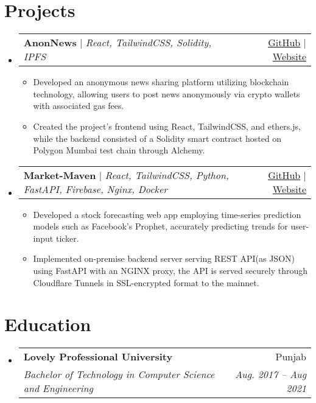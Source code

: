\documentclass[letterpaper,11pt]{article}
\makeatletter
\newcommand{\resumeItem}[1]{
  \item\small{
    {#1 \vspace{-2pt}}
  }
}
\newcommand{\resumeSubheading}[4]{
  \vspace{-2pt}\item
    \begin{tabular*}{0.97\textwidth}[t]{l@{\extracolsep{\fill}}r}
      \textbf{#1} & #2 \\
      \textit{\small#3} & \textit{\small #4} \\
    \end{tabular*}\vspace{-7pt}
}
\newcommand{\resumeProjectHeading}[2]{
    \item
    \begin{tabular*}{0.97\textwidth}{l@{\extracolsep{\fill}}r}
      \small#1 & #2 \\
    \end{tabular*}\vspace{-7pt}
}
\newcommand{\resumeSubHeadingListStart}{\begin{itemize}[leftmargin=0.15in, label={}]}
\newcommand{\resumeSubHeadingListEnd}{\end{itemize}}
\newcommand{\resumeItemListStart}{\begin{itemize}}
\newcommand{\resumeItemListEnd}{\end{itemize}\vspace{-5pt}}
\makeatother
\begin{document}
\section{Projects}
    \resumeSubHeadingListStart
      \resumeProjectHeading
          {\textbf{AnonNews} $|$ \emph{React, TailwindCSS, Solidity, IPFS}}{\href{https://github.com/jayantdahiya/AnonNews}{\underline{GitHub}} $ | $ \href{https://anon-news.web.app/}{\underline{Website}}}
          \resumeItemListStart
            \resumeItem{Developed an anonymous news sharing platform utilizing blockchain technology, allowing users to post news anonymously via crypto wallets with associated gas fees.}
            \resumeItem{Created the project's frontend using React, TailwindCSS, and ethers.js, while the backend consisted of a Solidity smart contract hosted on Polygon Mumbai test chain through Alchemy.}
          \resumeItemListEnd
      \resumeProjectHeading
          {\textbf{Market-Maven} $|$ \emph{React, TailwindCSS, Python, FastAPI, Firebase, Nginx, Docker}}{\href{https://github.com/jayantdahiya/Market-Maven}{\underline{GitHub}} $ | $ \href{https://marketmavenai.web.app}{\underline{Website}}}
          \resumeItemListStart
            \resumeItem{Developed a stock forecasting web app employing time-series prediction models such as Facebook's Prophet, accurately predicting trends for user-input ticker.}
            \resumeItem{Implemented on-premise backend server serving REST API(as JSON) using FastAPI with an NGINX proxy, the API is served securely through Cloudflare Tunnels in SSL-encrypted format to the mainnet. }
          \resumeItemListEnd
\resumeSubHeadingListEnd



\section{Education}
  \resumeSubHeadingListStart
    \resumeSubheading
      {Lovely Professional University}{Punjab}
      {Bachelor of Technology in Computer Science and Engineering}{Aug. 2017 -- Aug 2021}
  \resumeSubHeadingListEnd
%

\end{document}

